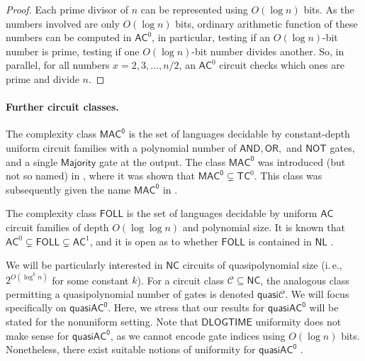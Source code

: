 \documentclass{theoretics}
\newcommand*{\ComplexityClass}[1]{\ensuremath{\mathsf{#1}}\xspace}
\newcommand{\AC}{\ComplexityClass{AC}}
\newcommand{\MACz}{\ComplexityClass{MAC^0}}
\newcommand{\qACz}{\ComplexityClass{quasiAC^0}}
\newcommand{\DLOGTIME}{\ComplexityClass{DLOGTIME}} %
\begin{document}
\begin{proof}
Each prime divisor of $n$ can be represented using $O(\log n)$ bits. As the numbers involved are only $O(\log n)$ bits, ordinary arithmetic function of these numbers can be computed in $\mathsf{AC}^0$, in particular, testing if an $O(\log n)$-bit number is prime, testing if one $O(\log n)$-bit number divides another. So, in parallel, for all numbers $x=2,3,\dotsc,n/2$, an $\mathsf{AC}^0$ circuit checks which ones are prime and divide $n$.
\end{proof}




\paragraph{Further circuit classes.} The complexity class $\MACz$ is the set of languages decidable by constant-depth uniform circuit families with a polynomial number of $\mathsf{AND}, \mathsf{OR},$ and $\mathsf{NOT}$ gates, and a single $\mathsf{Majority}$ gate at the output. The class $\MACz$ was introduced (but not so named) in \cite{VotingPolynomials}, where it was shown that $\MACz \subsetneq \mathsf{TC}^{0}$. This class was subsequently given the name $\MACz$ in \cite{LearnabilityAC0}.

The complexity class $\mathsf{FOLL}$ is the set of languages decidable by uniform $\AC$ circuit families of depth $O(\log \log n)$ and polynomial size. It is known that $\AC^{0} \subsetneq \mathsf{FOLL} \subsetneq \AC^{1}$, and it is open as to whether $\mathsf{FOLL}$ is contained in $\mathsf{NL}$ \cite{BKLM}.

We will be particularly interested in $\mathsf{NC}$ circuits of quasipolynomial size (i.\,e., $2^{O(\log^k n)}$ for some constant $k$). For a circuit class $\mathcal{C} \subseteq \mathsf{NC}$, the analogous class permitting a quasipolynomial number of gates is denoted $\mathsf{quasi}\mathcal{C}$. We will focus specifically on \qACz. Here, we stress that our results for \qACz will be stated for the nonuniform setting. Note that \DLOGTIME uniformity does not make sense for \qACz, as we cannot encode gate indices using $O(\log n)$ bits. Nonetheless, there exist suitable notions of uniformity for $\qACz$ \cite{BarringtonQuasipolynomial,FerrarottiGonzalezScheweTurull}. 
\end{document}
